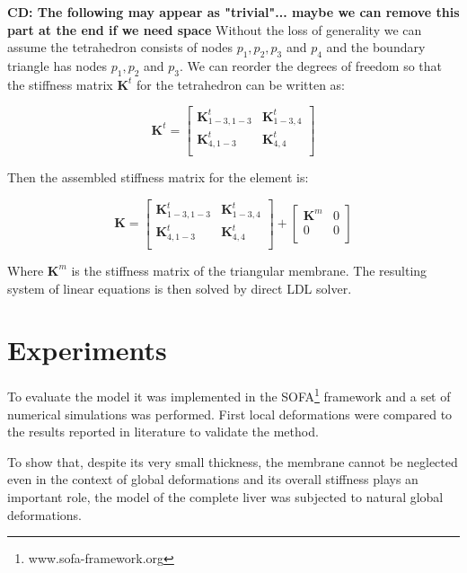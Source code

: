 \documentclass{llncs}
\newcommand{\CD}[1]{{\color{green}\textbf{CD: #1}}}
\newcommand{\Mat}[1]{\mathbf{#1}}
\begin{document}
\CD{The following may appear as "trivial"... maybe we can remove this part at the end if we need space} 
Without the loss of generality we can assume the tetrahedron consists of
nodes $p_1, p_2, p_3$ and $p_4$ and the boundary triangle has nodes $p_1, p_2$
and $p_3$. We can reorder the degrees of freedom so that the stiffness
matrix $\Mat{K}^t$ for the tetrahedron can be written as:

\begin{equation}
  \Mat{K}^t = \left[\begin{array}{c|c}
      \Mat{K}^t_{1-3,1-3} & \Mat{K}^t_{1-3,4} \\
      \hline
      \Mat{K}^t_{4,1-3} & \Mat{K}^t_{4,4} \\
  \end{array}\right]
\end{equation}

Then the assembled stiffness matrix for the element is:

\begin{equation}
  \Mat{K} = \left[\begin{array}{c|c}
      \Mat{K}^t_{1-3,1-3} & \Mat{K}^t_{1-3,4} \\
      \hline
      \Mat{K}^t_{4,1-3} & \Mat{K}^t_{4,4} \\
  \end{array}\right]
  +
  \left[\begin{array}{c|c}
      \Mat{K}^m & 0 \\
      \hline
      0 & 0 \\
  \end{array}\right]
\end{equation}

Where $\Mat{K}^m$ is the stiffness matrix of the triangular membrane.
The resulting
system of linear equations is then solved by direct LDL solver.




\section{Experiments} %

To evaluate the model it was implemented in the
SOFA\footnote{www.sofa-framework.org} framework and a set of
numerical simulations was performed. First local deformations were compared to the
results reported in literature to validate the method.

To show that, despite its very small thickness, the membrane cannot be
neglected even in the context of global deformations and its overall
stiffness plays an important role, the model of
the complete liver was subjected to natural global deformations.
\end{document}
